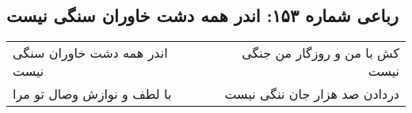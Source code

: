 \begin{center}
\section*{رباعی شماره ۱۵۳: اندر همه دشت خاوران سنگی نیست}
\label{sec:sh153}
\begin{longtable}{l p{0.5cm} r}
اندر همه دشت خاوران سنگی نیست
&&
کش با من و روزگار من جنگی نیست
\\
با لطف و نوازش وصال تو مرا
&&
دردادن صد هزار جان ننگی نیست
\\
\end{longtable}
\end{center}
